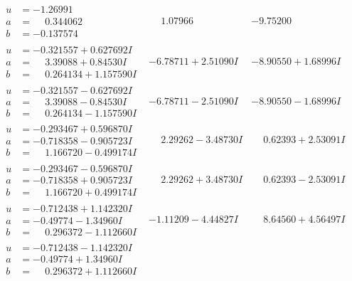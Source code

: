 \documentclass[1p]{elsarticle_modified}
\theoremstyle{definition}
\begin{document}
$$\begin{array}{c|c|c}
\begin{aligned}
u &= -1.26991\phantom{ +0.000000I} \\
a &= \phantom{-}0.344062\phantom{ +0.000000I} \\
b &= -0.137574\phantom{ +0.000000I}\end{aligned}
 & \phantom{-}1.07966\phantom{ +0.000000I} & -9.75200\phantom{ +0.000000I} \\ \hline\begin{aligned}
u &= -0.321557 + 0.627692 I \\
a &= \phantom{-}3.39088 + 0.84530 I \\
b &= \phantom{-}0.264134 + 1.157590 I\end{aligned}
 & -6.78711 + 2.51090 I & -8.90550 + 1.68996 I \\ \hline\begin{aligned}
u &= -0.321557 - 0.627692 I \\
a &= \phantom{-}3.39088 - 0.84530 I \\
b &= \phantom{-}0.264134 - 1.157590 I\end{aligned}
 & -6.78711 - 2.51090 I & -8.90550 - 1.68996 I \\ \hline\begin{aligned}
u &= -0.293467 + 0.596870 I \\
a &= -0.718358 - 0.905723 I \\
b &= \phantom{-}1.166720 - 0.499174 I\end{aligned}
 & \phantom{-}2.29262 - 3.48730 I & \phantom{-}0.62393 + 2.53091 I \\ \hline\begin{aligned}
u &= -0.293467 - 0.596870 I \\
a &= -0.718358 + 0.905723 I \\
b &= \phantom{-}1.166720 + 0.499174 I\end{aligned}
 & \phantom{-}2.29262 + 3.48730 I & \phantom{-}0.62393 - 2.53091 I \\ \hline\begin{aligned}
u &= -0.712438 + 1.142320 I \\
a &= -0.49774 - 1.34960 I \\
b &= \phantom{-}0.296372 - 1.112660 I\end{aligned}
 & -1.11209 - 4.44827 I & \phantom{-}8.64560 + 4.56497 I \\ \hline\begin{aligned}
u &= -0.712438 - 1.142320 I \\
a &= -0.49774 + 1.34960 I \\
b &= \phantom{-}0.296372 + 1.112660 I\end{aligned}

\end{array}$$
\end{document}
